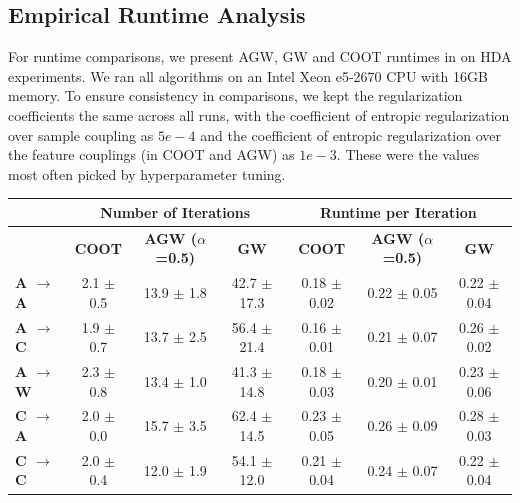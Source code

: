 \subsection{Empirical Runtime Analysis} \label{subsec:chap5_runtime}
For runtime comparisons, we present AGW, GW and COOT runtimes in 
on HDA experiments. We ran all algorithms on an Intel Xeon e5-2670 CPU with 16GB memory.
To ensure consistency in comparisons, we kept the regularization coefficients the same across
all runs, with the coefficient of entropic regularization over sample coupling as $5e-4$ and
the coefficient of entropic regularization over the feature couplings (in COOT and AGW) as $1e-3$.
These were the values most often picked by hyperparameter tuning.

\begin{table}[t]
\small
\begin{tabular}{@{}lccc|ccc@{}}
\toprule
                           & \multicolumn{3}{c|}{\textbf{Number of Iterations}}                      & \multicolumn{3}{c}{\textbf{Runtime per Iteration}}                     \\ \midrule
                           & \textbf{COOT}        & \textbf{AGW ($\alpha$=0.5)} & \textbf{GW}           & \textbf{COOT}        & \textbf{AGW ($\alpha$=0.5)} & \textbf{GW}          \\
\textbf{A $\rightarrow$ A} & 2.1 $\pm$ 0.5               & 13.9 $\pm$ 1.8              & 42.7 $\pm$ 17.3          & 0.18 $\pm$ 0.02         & 0.22 $\pm$ 0.05             & 0.22 $\pm$ 0.04         \\
\textbf{A $\rightarrow$ C} & 1.9 $\pm$ 0.7               & 13.7 $\pm$ 2.5              & 56.4 $\pm$ 21.4          & 0.16 $\pm$ 0.01         & 0.21 $\pm$ 0.07             & 0.26 $\pm$ 0.02         \\
\textbf{A $\rightarrow$ W} & 2.3 $\pm$ 0.8               & 13.4 $\pm$ 1.0              &41.3 $\pm$ 14.8          & 0.18 $\pm$ 0.03         & 0.20 $\pm$ 0.01            & 0.23 $\pm$ 0.06        \\
\textbf{C $\rightarrow$ A} & 2.0 $\pm$ 0.0               & 15.7 $\pm$ 3.5              & 62.4 $\pm$ 14.5         & 0.23 $\pm$ 0.05         & 0.26 $\pm$ 0.09             & 0.28 $\pm$ 0.03         \\
\textbf{C $\rightarrow$ C} & 2.0 $\pm$ 0.4               & 12.0 $\pm$ 1.9              & 54.1 $\pm$ 12.0         & 0.21 $\pm$ 0.04         & 0.24 $\pm$ 0.07             & 0.22 $\pm$ 0.04         \\

\end{tabular}
\end{table}
